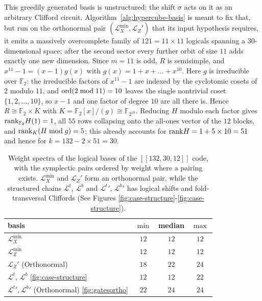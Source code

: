 This greedily generated basis is unstructured: the shift $\sigma$ acts on it as an arbitrary Clifford circuit.  Algorithm~\ref{alg:hypercube-basis} is meant to fix that, but run on the orthonormal pair $(\mathcal{L}_X^{\min},\mathcal{L}_Z')$ that its input hypothesis requires, it emits a massively overcomplete family of $121=11\times11$ logicals spanning a $30$-dimensional space; after the second sector every further orbit of size $11$ adds exactly one new dimension. Since $m=11$ is odd, $R$ is semisimple, and $x^{11}-1=(x-1)g(x)$ with $g(x)=1+x+\dots+x^{10}$.  Here $g$ is irreducible over $\mathbb{F}_2$: the irreducible factors of $x^{11}-1$ are indexed by the cyclotomic cosets of $2$ modulo $11$, and $\mathrm{ord}(2 \bmod 11)=10$ leaves the single nontrivial coset $\{1,2,\dots,10\}$, so $x-1$ and one factor of degree $10$ are all there is.  Hence $R\cong\mathbb{F}_2\times K$ with $K=\mathbb{F}_2[x]/(g)\cong\mathbb{F}_{2^{10}}$.
Reducing $H$ modulo each factor gives $\mathrm{rank}_{\mathbb{F}_2}H(1)=1$, all $55$ rows collapsing onto the all-ones vector of the $12$ blocks, and $\mathrm{rank}_{K}(H\bmod g)=5$; this already accounts for $\mathrm{rank} H=1+5\times10=51$ and hence for $k=132-2\times51=30$.  
\begin{table}[h]
\centering
\begin{tabular}{lccc}
\toprule
basis & $\min$ & median & $\max$ \\
\midrule
$\mathcal{L}_X^{\min}$ & $12$ & $12$ & $12$ \\
$\mathcal{L}_Z^{\min}$ & $12$ & $12$ & $12$ \\
$\mathcal{L}_Z'$ (Orthonormal) & $18$ & $22$ & $24$ \\
\midrule
 $\mathcal{L}^t$, $\mathcal{L}^b$ \ref{fig:case-structure}& $12$ & $12$ & $22$ \\
 ${\mathcal{L}^t}', {\mathcal{L}^b}'$ (Orthonormal) \ref{fig:gatesortho} & $22$ & $24$ & $24$ \\
\bottomrule
\end{tabular}
\caption{Weight spectra of the logical bases of the $[[132,30,12]]$ code, with the
symplectic pairs ordered by weight where a pairing exists. $\mathcal{L}_X^{\min}$ and
$\mathcal{L}_Z'$ form an orthonormal pair, while the structured chains $\mathcal{L}^t$, $\mathcal{L}^b$ and ${\mathcal{L}^t}'$, ${\mathcal{L}^b}'$ has logical shifts and fold-transversal Cliffords (See Figures \ref{fig:case-structure}-\ref{fig:case-structure}).}
\label{tab:case-bases}
\end{table}

